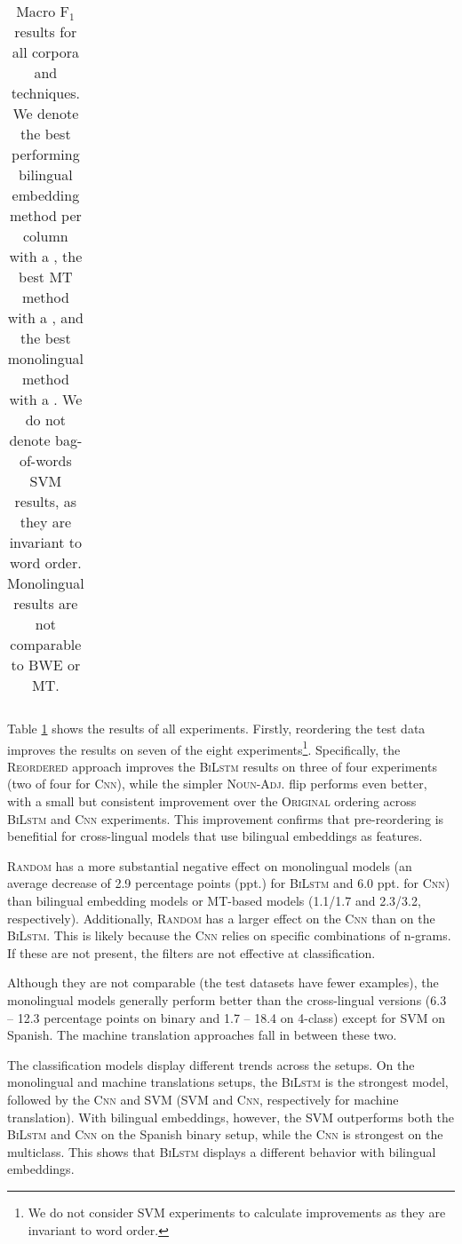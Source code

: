 \documentclass[11pt,a4paper]{article}
\newcommand{\original}{\textsc{Original}\xspace}
\newcommand{\mtreordered}{\textsc{Reordered}\xspace}
\newcommand{\nadj}{\textsc{Noun-Adj.}\xspace}
\newcommand{\random}{\textsc{Random}\xspace}
\newcommand{\bilstm}{\textsc{BiLstm}\xspace}
\newcommand{\cnn}{\textsc{Cnn}\xspace}
\newcommand{\F}{$\text{F}_1$\xspace}
\begin{document}
\begin{table}
\begin{tabular}{lllcccccccccccc}
\\

\bottomrule
\end{tabular}
\caption{Macro \F results for all corpora and techniques. We denote
  the best performing bilingual embedding
  method per column with a , the best MT method with a , and the best monolingual method
  with a . We do not denote bag-of-words SVM results, as they are invariant to word order. Monolingual results are not comparable to BWE or MT.}
\label{results:all}
\end{table}

Table \ref{results:all} shows the results of all experiments. Firstly, reordering the test data improves the results on seven of the eight experiments\footnote{We do not consider SVM experiments to calculate improvements as they are invariant to word order.}. Specifically, the \mtreordered approach improves the \bilstm results on three of four experiments (two of four for \cnn), while the simpler \nadj flip performs even better, with a small but consistent improvement over the \original ordering across \bilstm and \cnn experiments. This improvement confirms that pre-reordering is benefitial for cross-lingual models that use bilingual embeddings as features.

\random has a more substantial negative effect on monolingual models (an average decrease of 2.9 percentage points (ppt.) for \bilstm and 6.0 ppt. for \cnn) than bilingual embedding models or MT-based models (1.1/1.7 and 2.3/3.2, respectively). Additionally, \random has a larger effect on the \cnn than on the \bilstm. This is likely because the \cnn relies on specific combinations of n-grams. If these are not present, the filters are not effective at classification.

Although they are not comparable (the test datasets have fewer examples), the monolingual models generally perform better than the cross-lingual versions (6.3 -- 12.3 percentage points on binary and 1.7 -- 18.4 on 4-class) except for SVM on Spanish. The machine translation approaches fall in between these two.

The classification models display different trends across the setups. On the monolingual and machine translations setups, the \bilstm is the strongest model, followed by the \cnn and SVM (SVM and \cnn, respectively for machine translation). With bilingual embeddings, however, the SVM outperforms both the \bilstm and \cnn on the Spanish binary setup, while the \cnn is strongest on the multiclass.  This shows that \bilstm displays a different behavior with bilingual embeddings.
\end{document}
